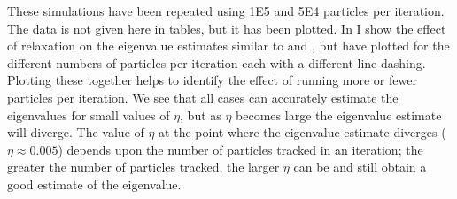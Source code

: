 \begin{comment}
          0.0005 &   152 & 2.487e+10 & 0.9772 $\pm$  2.4\e{-5} &  21919.0 & 77335.2 \\
         0.00075 &   163 & 2.478e+10 & 0.9772 $\pm$  2.5\e{-5} &  21508.5 & 77428.2 \\
           0.001 &   172 & 2.481e+10 & 0.9772 $\pm$  2.2\e{-5} &  25879.4 & 83281.9 \\
          0.0025 &   209 & 2.496e+10 & 0.9772 $\pm$  1.9\e{-5} &  34091.5 & 77802.5 \\
           0.005 &   246 & 2.519e+10 & 0.9772 $\pm$  2.0\e{-5} &  31219.7 & 78527.0 \\
          0.0075 &   277 & 2.493e+10 & 0.9772 $\pm$  1.8\e{-5} &  36500.0 & 83692.5 \\
            0.01 &   326 & 2.486e+10 & 0.9772 $\pm$  1.7\e{-5} &  43478.8 & 77694.0 \\
            0.05 &   940 & 2.484e+10 & 0.9772 $\pm$  1.7\e{-5} &  45754.9 & 77564.5 \\
             0.1 &  1348 & 2.511e+10 & 0.9772 $\pm$  2.2\e{-5} &  27421.1 & 78792.5 \\
            0.25 &  1793 & 2.498e+10 & 0.9773 $\pm$  3.7\e{-5} &   9560.7 & 78116.6 \\
             0.5 &  2022 & 2.484e+10 & 0.9772 $\pm$  5.5\e{-5} &   4217.4 & 77177.2 \\
            0.75 &  2124 & 2.489e+10 & 0.9769 $\pm$  7.1\e{-5} &   2596.2 & 77363.6 \\
               1 &  2190 & 2.503e+10 & 0.9768 $\pm$  9.0\e{-5} &   1495.3 & 82681.7 \\
        \bottomrule
    \end{tabular}
    \caption{Second higher order eigenvalue estimates with relaxation tracking 5E6 particles.}
    \label{tab:Relaxed5E62}
\end{table}
\end{comment}

These simulations have been repeated using 1E5 and 5E4 particles per iteration.  The data is not given here in tables, but it has been plotted.  In  I show the effect of relaxation on the eigenvalue estimates similar to  and , but have plotted for the different numbers of particles per iteration each with a different line dashing.  Plotting these together helps to identify the effect of running more or fewer particles per iteration.  We see that all cases can accurately estimate the eigenvalues for small values of $\eta$, but as $\eta$ becomes large the eigenvalue estimate will diverge.  The value of $\eta$ at the point where the eigenvalue estimate diverges ($\eta \approx 0.005$) depends upon the number of particles tracked in an iteration; the greater the number of particles tracked, the larger $\eta$ can be and still obtain a good estimate of the eigenvalue.  

